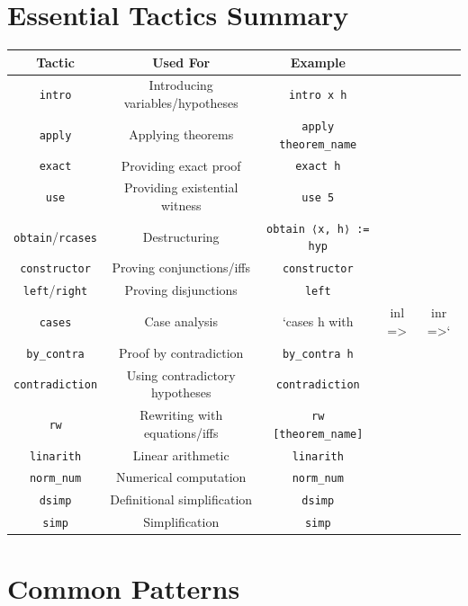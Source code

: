 \documentclass{amsart}
\theoremstyle{plain}
\theoremstyle{definition}
\theoremstyle{remark}
\begin{document}
\section{Essential Tactics Summary}

\begin{table}[h]
	\centering
	\begin{tabular}{|c|c|c|c|c|}
		\hline
		Tactic & Used For & Example \\
		\hline
		\lstinline{intro} & Introducing variables/hypotheses & \lstinline{intro x h} \\
		\hline
		\lstinline{apply} & Applying theorems & \lstinline{apply theorem_name} \\
		\hline
		\lstinline{exact} & Providing exact proof & \lstinline{exact h} \\
		\hline
		\lstinline{use} & Providing existential witness & \lstinline{use 5} \\
		\hline
		\lstinline{obtain}/\lstinline{rcases} & Destructuring & \lstinline{obtain ⟨x, h⟩ := hyp} \\
		\hline
		\lstinline{constructor} & Proving conjunctions/iffs & \lstinline{constructor} \\
		\hline
		\lstinline{left}/\lstinline{right} & Proving disjunctions & \lstinline{left} \\
		\hline
		\lstinline{cases} & Case analysis & `cases h with & inl => & inr =>` \\
		\hline
		\lstinline{by_contra} & Proof by contradiction & \lstinline{by_contra h} \\
		\hline
		\lstinline{contradiction} & Using contradictory hypotheses & \lstinline{contradiction} \\
		\hline
		\lstinline{rw} & Rewriting with equations/iffs & \lstinline{rw [theorem_name]} \\
		\hline
		\lstinline{linarith} & Linear arithmetic & \lstinline{linarith} \\
		\hline
		\lstinline{norm_num} & Numerical computation & \lstinline{norm_num} \\
		\hline
		\lstinline{dsimp} & Definitional simplification & \lstinline{dsimp} \\
		\hline
		\lstinline{simp} & Simplification & \lstinline{simp} \\
		\hline
	\end{tabular}
\end{table}
\section{Common Patterns}
\end{document}
